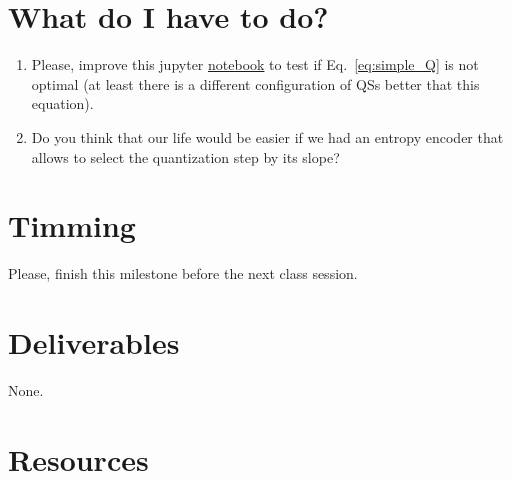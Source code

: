 \section{What do I have to do?}
\begin{enumerate}
\item Please, improve this jupyter
  \href{https://github.com/Sistemas-Multimedia/Sistemas-Multimedia.github.io/blob/master/milestones/05-RGB_quantization/RGB_quantization.ipynb}{notebook}
  to test if Eq.~\ref{eq:simple_Q} is not optimal (at least there is a
  different configuration of QSs better that this equation).
\item Do you think that our life would be easier if we had an entropy
  encoder that allows to select the quantization step by its slope?
\end{enumerate}

\section{Timming}

Please, finish this milestone before the next class session.

\section{Deliverables}

None.

\section{Resources}

\renewcommand{\addcontentsline}[3]{}%

